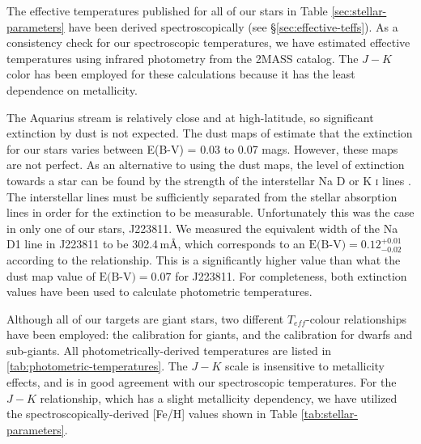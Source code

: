 \documentclass{emulateapj}
\begin{document}
The effective temperatures published for all of our stars in Table \ref{sec:stellar-parameters} have been derived spectroscopically (see \S\ref{sec:effective-teffs}). As a consistency check for our spectroscopic temperatures, we have estimated effective temperatures using infrared photometry from the 2MASS catalog. The $J-K$ color has been employed for these calculations because it has the least dependence on metallicity. 

The Aquarius stream is relatively close and at high-latitude, so significant extinction by dust is not expected. The dust maps of \citet{schlegel;et-al_1998} estimate that the extinction for our stars varies between E(B-V) = 0.03 to 0.07 mags. However, these maps are not perfect. As an alternative to using the \citet{schlegel;et-al_1998} dust maps, the level of extinction towards a star can be found by the strength of the interstellar Na D or K \textsc{i} lines \citep{munari;zwitter_1997}. The interstellar lines must be sufficiently separated from the stellar absorption lines in order for the extinction to be measurable. Unfortunately this was the case in only one of our stars, J223811. We measured the equivalent width of the Na D1 line in J223811 to be 302.4\,m{\AA}, which corresponds to an $\mbox{E(B-V)} = 0.12^{+0.01}_{-0.02}$ according to the \citet{munari;zwitter_1997} relationship. This is a significantly higher value than what the \citet{schlegel;et-al_1998} dust map value of $\mbox{E(B-V)} = 0.07$ for J223811. For completeness, both extinction values have been used to calculate photometric temperatures. 

Although all of our targets are giant stars, two different $T_{eff}$-colour relationships have been employed: the \citet{alonso;et-al_1999} calibration for giants, and the \citet{casagrande;et-al_2010} calibration for dwarfs and sub-giants. All photometrically-derived temperatures are listed in \ref{tab:photometric-temperatures}. The \citet{alonso;et-al_1999} $J-K$ scale is insensitive to metallicity effects, and is in good agreement with our spectroscopic temperatures. For the \citet{casagrande;et-al_2010} $J-K$ relationship, which has a slight metallicity dependency, we have utilized the spectroscopically-derived [Fe/H] values shown in Table \ref{tab:stellar-parameters}.
\end{document}
